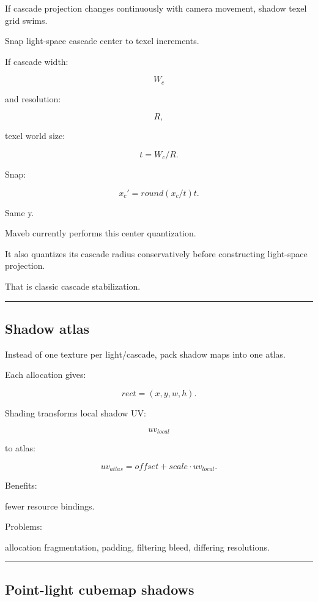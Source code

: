 If cascade projection changes continuously with camera movement, shadow texel grid swims.

Snap light-space cascade center to texel increments.

If cascade width:

\[
W_c
\]

and resolution:

\[
R,
\]

texel world size:

\[
t=
W_c/R.
\]

Snap:

\[
\boxed{
x_c'
=
round(x_c/t)t.
}
\]

Same y.

Maveb currently performs this center quantization.

It also quantizes its cascade radius conservatively before constructing light-space projection.

That is classic cascade stabilization.

\begin{center}\rule{0.5\linewidth}{0.5pt}\end{center}

\subsection{Shadow atlas}\label{04-visual-computing-ii-ch040-shadow-atlas}

Instead of one texture per light/cascade, pack shadow maps into one atlas.

Each allocation gives:

\[
rect=
(x,y,w,h).
\]

Shading transforms local shadow UV:

\[
uv_{local}
\]

to atlas:

\[
uv_{atlas}
=
offset+
scale\cdot uv_{local}.
\]

Benefits:

fewer resource bindings.

Problems:

allocation fragmentation, padding, filtering bleed, differing resolutions.

\begin{center}\rule{0.5\linewidth}{0.5pt}\end{center}

\subsection{Point-light cubemap shadows}\label{04-visual-computing-ii-ch040-point-light-cubemap-shadows}

